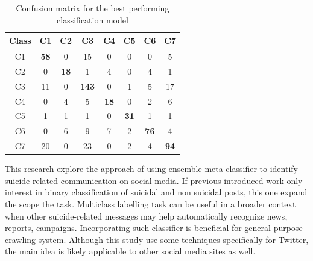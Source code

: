 \begin{table}
\center
\small
\noindent\begin{tabularx}{0.5\textwidth}{cccccccc}
\toprule
Class & C1 & C2 & C3 & C4 & C5 & C6 & C7  \\ 
\midrule
C1  & \textbf{58} & 0 & 15 & 0 & 0 & 0 & 5\\
C2 & 0 &  \textbf{18} &  1 &  4 &  0 &  4 &  1 \\
C3 & 11 &  0 &  \textbf{143} &  0 &  1 &  5 &  17  \\
C4 & 0  &  4 &  5 &  \textbf{18} &  0 &  2 &  6\\
C5 & 1 &  1 &  1 &  0 &  \textbf{31} &  1 &  1\\
C6 & 0 &  6 &  9 &  7 &  2 &  \textbf{76} &  4 \\
C7 & 20 &  0 &  23 &  0 &  2 &  4 &  \textbf{94}\\
\bottomrule
\end{tabularx}
\caption{Confusion matrix for the best performing classification model \cite{Burnap2015}}
\label{tab:confusion_matrix}
\end{table}
This research explore the approach of using ensemble meta classifier to identify suicide-related communication on social media. If previous introduced work only interest in binary classification of suicidal and non suicidal posts, this one expand the scope the task. Multiclass labelling task can be useful in a broader context when other suicide-related messages may help automatically recognize news, reports, campaigns. Incorporating such classifier is beneficial for general-purpose crawling system. Although this study use some techniques specifically for Twitter, the main idea is likely applicable to other social media sites as well. 
